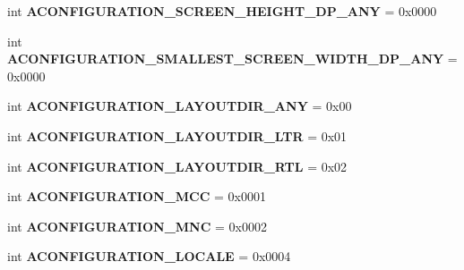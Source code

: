 \begin{DoxyCompactItemize}
int {\bfseries A\+C\+O\+N\+F\+I\+G\+U\+R\+A\+T\+I\+O\+N\+\_\+\+S\+C\+R\+E\+E\+N\+\_\+\+H\+E\+I\+G\+H\+T\+\_\+\+D\+P\+\_\+\+A\+NY} = 0x0000
\item 
\mbox{\label{classarsc_1_1external_1_1configuration_1_1AConfiguration_acfa6735023caa0d52292d1228f589ea7}} 
int {\bfseries A\+C\+O\+N\+F\+I\+G\+U\+R\+A\+T\+I\+O\+N\+\_\+\+S\+M\+A\+L\+L\+E\+S\+T\+\_\+\+S\+C\+R\+E\+E\+N\+\_\+\+W\+I\+D\+T\+H\+\_\+\+D\+P\+\_\+\+A\+NY} = 0x0000
\item 
\mbox{\label{classarsc_1_1external_1_1configuration_1_1AConfiguration_a46e622e0316d8f38c0f1799ec098ebbd}} 
int {\bfseries A\+C\+O\+N\+F\+I\+G\+U\+R\+A\+T\+I\+O\+N\+\_\+\+L\+A\+Y\+O\+U\+T\+D\+I\+R\+\_\+\+A\+NY} = 0x00
\item 
\mbox{\label{classarsc_1_1external_1_1configuration_1_1AConfiguration_ac5c6e35199260ab6648ff4aac17e5b78}} 
int {\bfseries A\+C\+O\+N\+F\+I\+G\+U\+R\+A\+T\+I\+O\+N\+\_\+\+L\+A\+Y\+O\+U\+T\+D\+I\+R\+\_\+\+L\+TR} = 0x01
\item 
\mbox{\label{classarsc_1_1external_1_1configuration_1_1AConfiguration_a669a5f79ce81e7e4691c051b80402cf3}} 
int {\bfseries A\+C\+O\+N\+F\+I\+G\+U\+R\+A\+T\+I\+O\+N\+\_\+\+L\+A\+Y\+O\+U\+T\+D\+I\+R\+\_\+\+R\+TL} = 0x02
\item 
\mbox{\label{classarsc_1_1external_1_1configuration_1_1AConfiguration_a96a475fed198a17eb2d5fc4fb6cdd7e8}} 
int {\bfseries A\+C\+O\+N\+F\+I\+G\+U\+R\+A\+T\+I\+O\+N\+\_\+\+M\+CC} = 0x0001
\item 
\mbox{\label{classarsc_1_1external_1_1configuration_1_1AConfiguration_a572376849e72b7bbaf276642684bdca1}} 
int {\bfseries A\+C\+O\+N\+F\+I\+G\+U\+R\+A\+T\+I\+O\+N\+\_\+\+M\+NC} = 0x0002
\item 
\mbox{\label{classarsc_1_1external_1_1configuration_1_1AConfiguration_ad7f14a8ac225a77cff64f95e7093d505}} 
int {\bfseries A\+C\+O\+N\+F\+I\+G\+U\+R\+A\+T\+I\+O\+N\+\_\+\+L\+O\+C\+A\+LE} = 0x0004

\end{DoxyCompactItemize}
